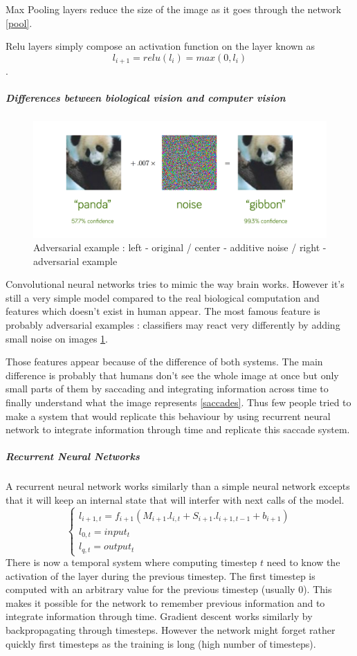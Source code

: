 \documentclass[11pt]{article}
\begin{document}
Max Pooling layers reduce the size of the image as it goes through the network \ref{pool}.

Relu layers simply compose an activation function on the layer known as $$l_{i+1} = relu(l_i) = max(0,l_i)$$.
\subparagraph{Differences between biological vision and computer vision}

\begin{figure}[!h]
\centering
\includegraphics[scale=0.10]{adversarial.png}
\caption{Adversarial example : left - original / center - additive noise / right - adversarial example}
\label{adversarial}
\end{figure}

Convolutional neural networks tries to mimic the way brain works. However it's still a very simple model compared to the real biological computation and features which doesn't exist in human appear. The most famous feature is probably adversarial examples : classifiers may react very differently by adding small noise on images \ref{adversarial}.

Those features appear because of the difference of both systems. The main difference is probably that humans don't see the whole image at once but only small parts of them by saccading and integrating information across time to finally understand what the image represents \ref{saccades}. Thus few people tried to make a system that would replicate this behaviour by using recurrent neural network to integrate information through time and replicate this saccade system.
\subparagraph{Recurrent Neural Networks}
A recurrent neural network works similarly than a simple neural network excepts that it will keep an internal state that will interfer with next calls of the model.
\begin{equation*}
\begin{cases}
l_{i+1,t} = f_{i+1}(M_{i+1}. l_{i,t} + S_{i+1}.l_{i+1,t-1} + b_{i+1}) \\
l_{0,t} = input_t \\
l_{q,t} = output_t
\end{cases}
\end{equation*}
There is now a temporal system where computing timestep $t$ need to know the activation of the layer during the previous timestep. The first timestep is computed with an arbitrary value for the previous timestep (usually 0). This makes it possible for the network to remember previous information and to integrate information through time. Gradient descent works similarly by backpropagating through timesteps. However the network might forget rather quickly first timesteps as the training is long (high number of timesteps).
\end{document}

